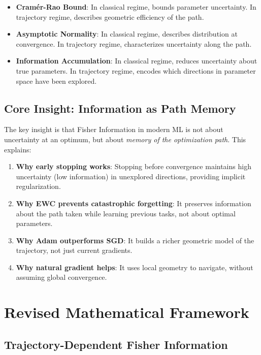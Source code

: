 \documentclass[11pt]{article}
\begin{document}
\begin{itemize}
\item \textbf{Cramér-Rao Bound}: In classical regime, bounds parameter uncertainty. In trajectory regime, describes geometric efficiency of the path.

\item \textbf{Asymptotic Normality}: In classical regime, describes distribution at convergence. In trajectory regime, characterizes uncertainty along the path.

\item \textbf{Information Accumulation}: In classical regime, reduces uncertainty about true parameters. In trajectory regime, encodes which directions in parameter space have been explored.
\end{itemize}

\subsection*{Core Insight: Information as Path Memory}

The key insight is that Fisher Information in modern ML is not about uncertainty at an optimum, but about \emph{memory of the optimization path}. This explains:

\begin{enumerate}
\item \textbf{Why early stopping works}: Stopping before convergence maintains high uncertainty (low information) in unexplored directions, providing implicit regularization.

\item \textbf{Why EWC prevents catastrophic forgetting}: It preserves information about the path taken while learning previous tasks, not about optimal parameters.

\item \textbf{Why Adam outperforms SGD}: It builds a richer geometric model of the trajectory, not just current gradients.

\item \textbf{Why natural gradient helps}: It uses local geometry to navigate, without assuming global convergence.
\end{enumerate}

\section*{Revised Mathematical Framework}

\subsection*{Trajectory-Dependent Fisher Information}
\end{document}

